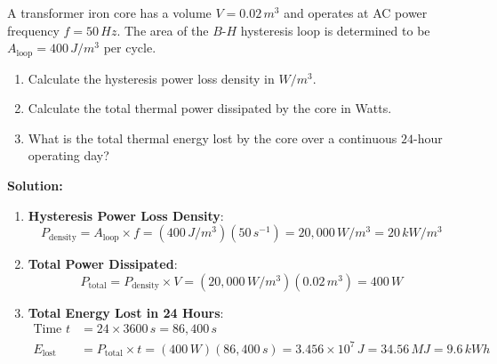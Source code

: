 \begin{example}
A transformer iron core has a volume $V = 0.02\,\si{m^3}$ and operates at AC power frequency $f = 50\,\si{Hz}$. The area of the $B$-$H$ hysteresis loop is determined to be $A_{\text{loop}} = 400\,\si{J/m^3}$ per cycle.
\begin{enumerate}
    \item Calculate the hysteresis power loss density in $\si{W/m^3}$.
    \item Calculate the total thermal power dissipated by the core in Watts.
    \item What is the total thermal energy lost by the core over a continuous $24\text{-hour}$ operating day?
\end{enumerate}

\textbf{Solution:}
\begin{enumerate}
    \item \textbf{Hysteresis Power Loss Density}:
    \begin{equation*}
        P_{\text{density}} = A_{\text{loop}} \times f = (400\,\si{J/m^3})(50\,\si{s^{-1}}) = 20,000\,\si{W/m^3} = 20\,\si{kW/m^3}
    \end{equation*}
    
    \item \textbf{Total Power Dissipated}:
    \begin{equation*}
        P_{\text{total}} = P_{\text{density}} \times V = (20,000\,\si{W/m^3})(0.02\,\si{m^3}) = 400\,\si{W}
    \end{equation*}
    
    \item \textbf{Total Energy Lost in 24 Hours}:
    \begin{align*}
        \text{Time } t &= 24 \times 3600\,\si{s} = 86,400\,\si{s} \\
        E_{\text{lost}} &= P_{\text{total}} \times t = (400\,\si{W})(86,400\,\si{s}) = 3.456 \times 10^7\,\si{J} = 34.56\,\si{MJ} = 9.6\,\si{kWh}
    \end{align*}
\end{enumerate}
\end{example}


